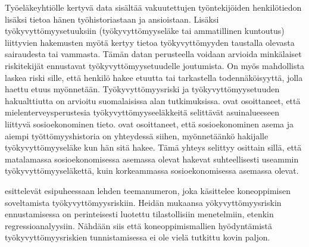 Työeläkeyhtiölle kertyvä data sisältää vakuutettujen työntekijöiden henkilötiedon lisäksi tietoa hänen työhistoriastaan ja ansioistaan. Lisäksi työkyvyttömyysetuuksiin (työkyvyttömyyseläke tai ammatillinen kuntoutus) liittyvien hakemusten myötä kertyy tietoa työkyvyttömyyden taustalla olevasta sairaudesta tai vammasta. Tämän datan perusteella voidaan arvioida minkälaiset riskitekijät ennustavat työkyvyttömyysetuudelle joutumista. On myös mahdollista laskea riski sille, että henkilö hakee etuutta tai tarkastella todennäköisyyttä, jolla haettu etuus myönnetään. Työkyvyttömyysriski ja työkyvyttömyysetuuden hakualttiutta on arvioitu suomalaisissa alan tutkimuksissa. \citet{karolaakso_contextual_2021, karolaakso_socioeconomic_2020} ovat osoittaneet, että mielenterveysperustesia työkyvyttömyyseeläkkeitä selittävät asuinalueeseen liittyvä sosioekonominen tieto. \citet{perhoniemi_determinants_2020, perhoniemi_tyokyvyttomyyselakehakemusten_2020} ovat osoittaneet, että sosioekonominen asema ja aiempi työttömyyshistoria on yhteydessä siihen, myönnetäänkö hakijalle työkyvyttömyyseläke kun hän sitä hakee. Tämä yhteys selittyy osittain sillä, että matalamassa sosioekonomisessa asemassa olevat hakevat suhteellisesti useammin työkyvyttömyyseläkettä, kuin korkeammassa sosioekonomisessa asemassa olevat.

\citet{gross_machine_2020} esittelevät esipuheessaan lehden teemanumeron, joka käsittelee koneoppimisen soveltamista työkyvyttömyysriskiin. Heidän mukaansa yökyvyttömyysriskin ennustamisessa on perinteisesti luotettu tilastollisiin menetelmiin, etenkin regressioanalyysiin. Nähdään siis että koneoppimismallien hyödyntämistä työkyvyttömyysriskien tunnistamisessa ei ole vielä tutkittu kovin paljon. 

